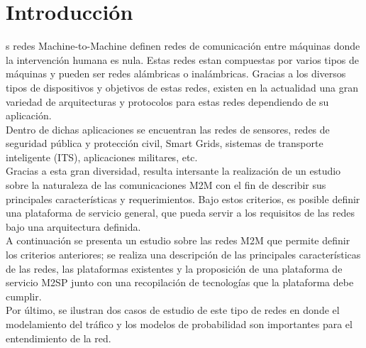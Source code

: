 \documentclass[journal]{IEEEtran}
\begin{document}
\section{Introducci\'on}
% 
% 
% 
% 
s redes Machine-to-Machine definen redes de comunicación entre máquinas donde la intervención humana es nula. Estas redes estan compuestas por varios tipos de máquinas y pueden ser redes alámbricas o inalámbricas. Gracias a los diversos tipos de dispositivos y objetivos de estas redes, existen en la actualidad una gran variedad de arquitecturas y protocolos para estas redes dependiendo de su aplicación.\\

Dentro de dichas aplicaciones se encuentran las redes de sensores, redes de seguridad pública y protección civil, Smart Grids, sistemas de transporte inteligente (ITS), aplicaciones militares, etc.\\

Gracias a esta gran diversidad, resulta intersante la realización de un estudio sobre la naturaleza de las comunicaciones M2M con el fin de describir sus principales características y requerimientos. Bajo estos criterios, es posible definir una plataforma de servicio general, que pueda servir a los requisitos de las redes bajo una arquitectura definida.\\

A continuación se presenta un estudio sobre las redes M2M que permite definir los criterios anteriores; se realiza una descripción de las principales características de las redes, las plataformas existentes y la proposición de una plataforma de servicio M2SP junto con una recopilación de tecnologías que la plataforma debe cumplir.\\

Por último, se ilustran dos casos de estudio de este tipo de redes en donde el modelamiento del tráfico y los modelos de probabilidad son importantes para el entendimiento de la red.
 
\end{document}
